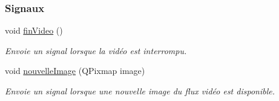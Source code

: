 \subsubsection*{Signaux}
\begin{DoxyCompactItemize}
\item 
void \hyperlink{class_camera_a4c560c4add60ebce65e2d9717e3d668c}{fin\+Video} ()
\begin{DoxyCompactList}\small\item\em Envoie un signal lorsque la vidéo est interrompu. \end{DoxyCompactList}\item 
void \hyperlink{class_camera_a38c810d466375e950401e483f885c52f}{nouvelle\+Image} (Q\+Pixmap image)
\begin{DoxyCompactList}\small\item\em Envoie un signal lorsque une nouvelle image du flux vidéo est disponible. \end{DoxyCompactList}\end{DoxyCompactItemize}
